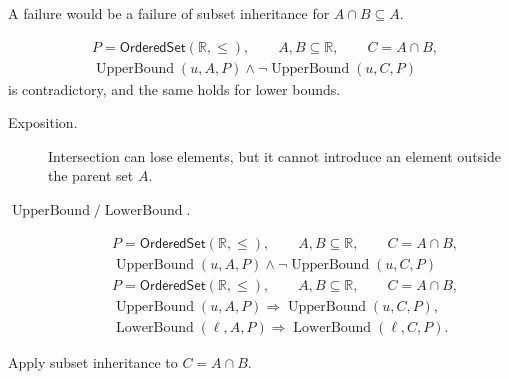 \begin{remark*}
A failure would be a failure of subset inheritance for $A\cap B\subseteq A$.
\end{remark*}

\begin{remark*}
\[
\begin{aligned}
&P=\mathsf{OrderedSet}(\mathbb{R},\leq),\qquad A,B\subseteq\mathbb{R},\qquad C=A\cap B,\\
&\operatorname{UpperBound}(u,A,P)\land
\neg\operatorname{UpperBound}(u,C,P)
\end{aligned}
\]
is contradictory, and the same holds for lower bounds.
\end{remark*}

\begin{remark*}
\begin{description}
\item[Exposition.]
Intersection can lose elements, but it cannot introduce an element outside the
parent set $A$.


  \item[\(\operatorname{UpperBound} / \operatorname{LowerBound}.\)]

\[
\begin{aligned}
&P=\mathsf{OrderedSet}(\mathbb{R},\leq),\qquad A,B\subseteq\mathbb{R},\qquad C=A\cap B,\\
&\operatorname{UpperBound}(u,A,P)\land
\neg\operatorname{UpperBound}(u,C,P)
\end{aligned}
\]
\[
\begin{aligned}
&P=\mathsf{OrderedSet}(\mathbb{R},\leq),\qquad A,B\subseteq\mathbb{R},\qquad C=A\cap B,\\
&\operatorname{UpperBound}(u,A,P)\Longrightarrow\operatorname{UpperBound}(u,C,P),\\
&\operatorname{LowerBound}(\ell,A,P)\Longrightarrow\operatorname{LowerBound}(\ell,C,P).
\end{aligned}
\]
\end{description}
\end{remark*}

\begin{remark*}[Interpretation]
Apply subset inheritance to $C=A\cap B$.
\end{remark*}


